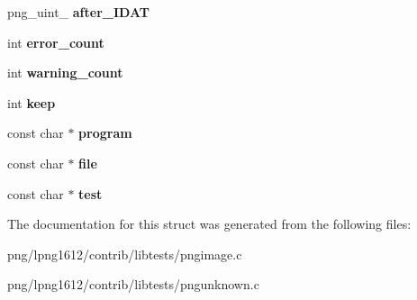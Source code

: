 \begin{DoxyCompactItemize}
\item 
\hypertarget{structdisplay_a170a5b1c73f2b63538210cd694a6e351}{png\+\_\+uint\+\_ {\bfseries after\+\_\+\+I\+D\+A\+T}}\label{structdisplay_a170a5b1c73f2b63538210cd694a6e351}

\item 
\hypertarget{structdisplay_aafb632fce095d553544ae5f66d721fe5}{int {\bfseries error\+\_\+count}}\label{structdisplay_aafb632fce095d553544ae5f66d721fe5}

\item 
\hypertarget{structdisplay_a5a30364c0ac79aec1523f1fdcaf93e6d}{int {\bfseries warning\+\_\+count}}\label{structdisplay_a5a30364c0ac79aec1523f1fdcaf93e6d}

\item 
\hypertarget{structdisplay_a7bf50772f92e7a6c6ad1d5eefc5e27d3}{int {\bfseries keep}}\label{structdisplay_a7bf50772f92e7a6c6ad1d5eefc5e27d3}

\item 
\hypertarget{structdisplay_a82f8f9fb32096344cd8b464eee384d1b}{const char $\ast$ {\bfseries program}}\label{structdisplay_a82f8f9fb32096344cd8b464eee384d1b}

\item 
\hypertarget{structdisplay_a24dad15a71a103a523c63bacb8ce0dac}{const char $\ast$ {\bfseries file}}\label{structdisplay_a24dad15a71a103a523c63bacb8ce0dac}

\item 
\hypertarget{structdisplay_ad8b3e184cd9fc9ae70c25eca927880c9}{const char $\ast$ {\bfseries test}}\label{structdisplay_ad8b3e184cd9fc9ae70c25eca927880c9}

\end{DoxyCompactItemize}


The documentation for this struct was generated from the following files\+:\begin{DoxyCompactItemize}
\item 
png/lpng1612/contrib/libtests/pngimage.\+c\item 
png/lpng1612/contrib/libtests/pngunknown.\+c\end{DoxyCompactItemize}
